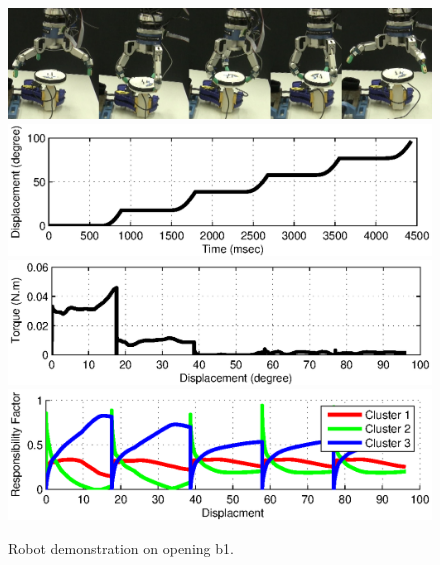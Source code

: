 \begin{figure}
  \centering
  \includegraphics[width=15cm]{./fig/demo_b1.jpg}
  \includegraphics[width=15cm]{./fig/demo_b1_s.eps}
  \includegraphics[width=15cm]{./fig/demo_b1_T.eps}
  \includegraphics[width=15cm]{./fig/demo_b1_rf.eps}
  \caption{ \scriptsize{Robot demonstration on opening b1.}
}
\label{fig:demo_b1}
\end{figure}


